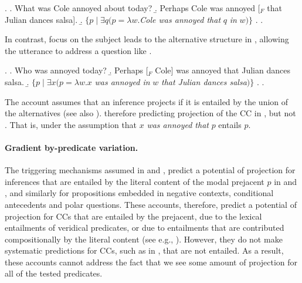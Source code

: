 \documentclass[a4paper,12pt,twoside]{article}
\begin{document}
		\ex. \a. What was Cole annoyed about today?
			\b. Perhaps Cole was annoyed [$_F$ that Julian dances salsa].
			\b. $\{p \mid \exists q(p = \lambda w.$\emph{Cole was annoyed that} $q$ \emph{in} $w)\}$
			\z.
		\z.

		In contrast, focus on the subject \Next[b] leads to the alternative structure in \Next[c], allowing the utterance to address a question like \Next[a].

		\ex. \a. Who was annoyed today?
			\b. Perhaps [$_F$ Cole] was annoyed that Julian dances salsa.
			\b. $\{p \mid \exists x(p = \lambda w.x$ \emph{was annoyed in} $w$ \emph{that Julian dances salsa}$)\}$
			\z.
		\z.

		The account assumes that an inference projects if it is entailed by the union of the alternatives (see also \citealt{abusch_presupposition_2010}). therefore predicting projection of the CC in \Last, but not \LLast. That is, under the assumption that $x$ \emph{was annoyed that} $p$ entails $p$.

		\paragraph{Gradient by-predicate variation.} The triggering mechanisms assumed in \citealt{abrusan_predicting_2011} and \citealt{simons_best_2017}, predict a potential of projection for inferences that are entailed by the literal content of the modal prejacent $p$ in \Last and \LLast, and similarly for propositions embedded in negative contexts, conditional antecedents and polar questions. These accounts, therefore, predict a potential of projection for CCs that are entailed by the prejacent, due to the lexical entailments of veridical predicates, or due to entailments that are contributed compositionally by the literal content (see e.g., \citealt{roberts_i_2019}). However, they do not make systematic predictions for CCs, such as in \Last, that are not entailed. As a result, these accounts cannot address the fact that we see some amount of projection for all of the tested predicates.
\end{document}
